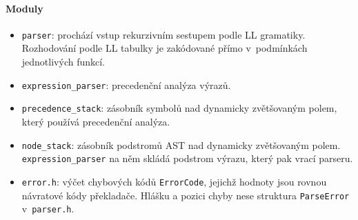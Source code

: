 \paragraph{Moduly}
\begin{itemize}
  \item \texttt{parser}: prochází vstup rekurzivním sestupem podle LL gramatiky. Rozhodování podle LL tabulky je zakódované přímo v~podmínkách jednotlivých funkcí.
  \item \texttt{expression\_parser}: precedenční analýza výrazů.
  \item \texttt{precedence\_stack}: zásobník symbolů nad dynamicky zvětšovaným polem, který používá precedenční analýza.
  \item \texttt{node\_stack}: zásobník podstromů AST nad dynamicky zvětšovaným polem. \texttt{expression\_parser} na něm skládá podstrom výrazu, který pak vrací parseru.
  \item \texttt{error.h}: výčet chybových kódů \texttt{ErrorCode}, jejichž hodnoty jsou rovnou návratové kódy překladače. Hlášku a pozici chyby nese struktura \texttt{ParseError} v~\texttt{parser.h}.
\end{itemize}
\fussy
